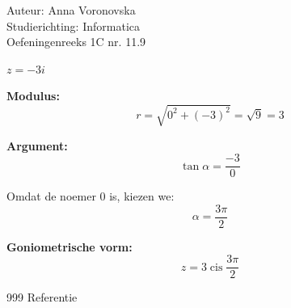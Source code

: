 \documentclass[a4paper]{article}
\begin{document}
\noindent \large Auteur: Anna Voronovska \\
\noindent \large Studierichting: Informatica \\
\noindent \large Oefeningenreeks 1C nr. 11.9 \\

\bigskip 

\normalsize
$z = -3i$\\

\medskip

\textbf{Modulus:}
\[
r = \sqrt{0^2 + (-3)^2} = \sqrt{9} = 3
\]

\medskip

\noindent \textbf{Argument:}
\[
\tan \alpha = \frac{-3}{0}
\]

Omdat de noemer 0 is, kiezen we:
\[
\alpha = \frac{3\pi}{2}
\]

\medskip

\textbf{Goniometrische vorm:}
\[
z = 3 \operatorname{cis} \frac{3\pi}{2}
\]


\begin{thebibliography}{999}
 Referentie
\end{thebibliography}
\end{document}

